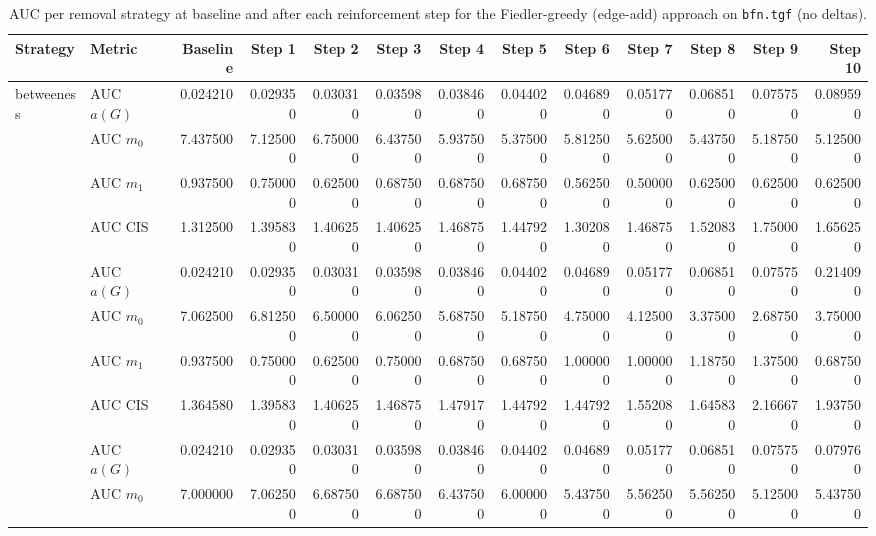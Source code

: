 \begin{table}[htbp]
  \centering
  \caption{AUC per removal strategy at baseline and after each reinforcement step for the Fiedler-greedy (edge-add) approach on \texttt{bfn.tgf} (no deltas).}
  \label{tab:bfn-fiedler_greedy-auc}
\setlength{\tabcolsep}{2.5pt}
  \begin{tabular}{llrrrrrrrrrrr}
    \toprule
    \textbf{Strategy} & \textbf{Metric} & \textbf{Baseline} & \textbf{Step 1} & \textbf{Step 2} & \textbf{Step 3} & \textbf{Step 4} & \textbf{Step 5} & \textbf{Step 6} & \textbf{Step 7} & \textbf{Step 8} & \textbf{Step 9} & \textbf{Step 10} \\
    \midrule
    \multirow{4}{*}{betweeness} & AUC $a(G)$ & 0.024210 & 0.029350 & 0.030310 & 0.035980 & 0.038460 & 0.044020 & 0.046890 & 0.051770 & 0.068510 & 0.075750 & 0.089590 \\
    & AUC $m_0$ & 7.437500 & 7.125000 & 6.750000 & 6.437500 & 5.937500 & 5.375000 & 5.812500 & 5.625000 & 5.437500 & 5.187500 & 5.125000 \\
    & AUC $m_1$ & 0.937500 & 0.750000 & 0.625000 & 0.687500 & 0.687500 & 0.687500 & 0.562500 & 0.500000 & 0.625000 & 0.625000 & 0.625000 \\
    & AUC CIS & 1.312500 & 1.395830 & 1.406250 & 1.406250 & 1.468750 & 1.447920 & 1.302080 & 1.468750 & 1.520830 & 1.750000 & 1.656250 \\
    \addlinespace
    \multirow{4}{*}{closeness} & AUC $a(G)$ & 0.024210 & 0.029350 & 0.030310 & 0.035980 & 0.038460 & 0.044020 & 0.046890 & 0.051770 & 0.068510 & 0.075750 & 0.214090 \\
    & AUC $m_0$ & 7.062500 & 6.812500 & 6.500000 & 6.062500 & 5.687500 & 5.187500 & 4.750000 & 4.125000 & 3.375000 & 2.687500 & 3.750000 \\
    & AUC $m_1$ & 0.937500 & 0.750000 & 0.625000 & 0.750000 & 0.687500 & 0.687500 & 1.000000 & 1.000000 & 1.187500 & 1.375000 & 0.687500 \\
    & AUC CIS & 1.364580 & 1.395830 & 1.406250 & 1.468750 & 1.479170 & 1.447920 & 1.447920 & 1.552080 & 1.645830 & 2.166670 & 1.937500 \\
    \addlinespace
    \multirow{4}{*}{core influence} & AUC $a(G)$ & 0.024210 & 0.029350 & 0.030310 & 0.035980 & 0.038460 & 0.044020 & 0.046890 & 0.051770 & 0.068510 & 0.075750 & 0.079760 \\
    & AUC $m_0$ & 7.000000 & 7.062500 & 6.687500 & 6.687500 & 6.437500 & 6.000000 & 5.437500 & 5.562500 & 5.562500 & 5.125000 & 5.437500 \\

\end{tabular}
\end{table}
